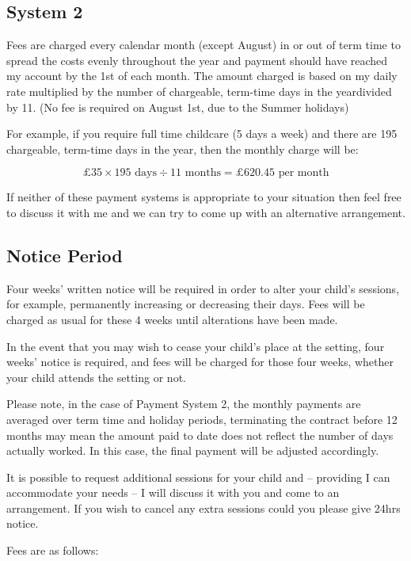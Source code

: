 \subsection{System 2}

Fees are charged every calendar month (except August) in or out of term time to spread the costs evenly throughout the year and payment should have reached my account by the 1st of each month. The amount charged is based on my daily rate multiplied by the number of chargeable, term-time days in the year\footnotemark[1] divided by 11. (No fee is required on August 1st, due to the Summer holidays) 

For example, if you require full time childcare (5 days a week) and there are 195 chargeable, term-time days in the year, then the monthly charge will be:

$$£35 \times 195 \text{ days} \div 11 \text{ months} = £620.45 \text{ per month}$$

If neither of these payment systems is appropriate to your situation then feel free to discuss it with me and we can try to come up with an alternative arrangement.

\subsection{Notice Period}

Four weeks' written notice will be required in order to alter your child's sessions, for example, permanently increasing or decreasing their days. Fees will be charged as usual for these 4 weeks until alterations have been made. 

In the event that you may wish to cease your child's place at the setting, four weeks' notice is required, and fees will be charged for those four weeks, whether your child attends the setting or not.

Please note, in the case of Payment System 2, the monthly payments are averaged over term time and holiday periods, terminating the contract before 12 months may mean the amount paid to date does not reflect the number of days actually worked. In this case, the final payment will be adjusted accordingly.

It is possible to request additional sessions for your child and – providing I can accommodate your needs – I will discuss it with you and come to an arrangement. If you wish to cancel any extra sessions could you please give 24hrs notice.

Fees are as follows:

